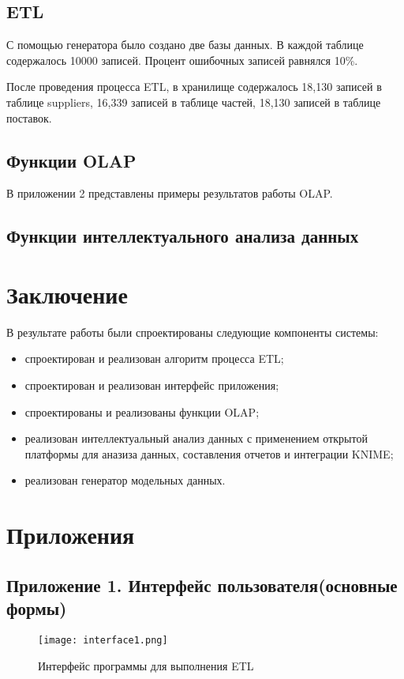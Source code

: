 \subsection{ETL}
С помощью генератора было создано две базы данных. В каждой таблице содержалось 10000 записей. Процент ошибочных записей равнялся 10\%.\par
После проведения процесса ETL, в хранилище содержалось 18,130 записей в таблице suppliers, 16,339 записей в таблице частей, 18,130 записей в таблице поставок.

\subsection{Функции OLAP}
В приложении 2 представлены примеры результатов работы OLAP.

\subsection{Функции интеллектуального анализа данных}

\section{Заключение}
В результате работы были спроектированы следующие компоненты системы:
\begin{itemize}
  \item спроектирован и реализован алгоритм процесса ETL;
  \item спроектирован и реализован интерфейс приложения;
  \item спроектированы и реализованы функции OLAP;
  \item реализован интеллектуальный анализ данных с применением открытой платформы для аназиза данных, составления отчетов и интеграции KNIME;
  \item реализован генератор модельных данных.
\end{itemize}

\section{Приложения}
\subsection{Приложение 1. Интерфейс пользователя(основные формы)}

\begin{figure}[h]
  \centering
  \texttt{[image: interface1.png]}
  \caption{Интерфейс программы для выполнения ETL}
  \label{etl-interface}
\end{figure}

